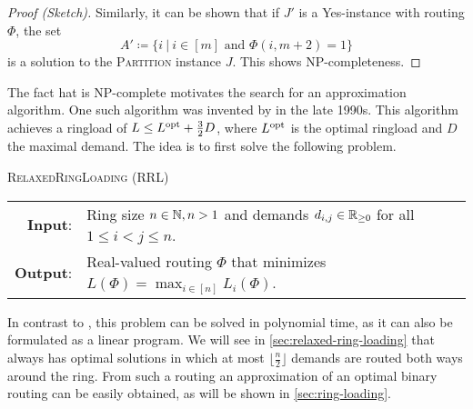\begin{proof}[Proof (Sketch)]
	Similarly, it can be shown that if $J'$ is a Yes-instance with routing $\Phi$, the set 
	\begin{equation}
		A' \coloneqq \{i \ |\ i \in [m] \text{ and } \Phi(i, m+2) = 1\}
	\end{equation} 
	is a solution to the \textsc{Partition} instance $J$.
	This shows NP-completeness.
\end{proof}



The fact hat \RL is NP-complete motivates the search for an approximation algorithm.
One such algorithm was invented by \citet{schrijver99} in the late 1990s.
This algorithm achieves a ringload of $L \leq L^{\mathrm{opt}} + \frac{3}{2}D$, where $L^{\mathrm{opt}}$ is the optimal ringload and $D$ the maximal demand.
The idea is to first solve the following problem.
\begin{center}
	\begin{mdframed}
		\centering
		\textsc{RelaxedRingLoading} (\textsc{RRL})\\[0.7em]
		\begin{tabular}{rl}
			{\bfseries Input}: & Ring size $n \in \mathbb{N}, n > 1$ and demands $d_{i, j} \in \mathbb{R}_{\geq 0}$ for all $1 \leq i<j\leq n$.\\
			{\bfseries Output}: & Real-valued routing $\Phi$ that minimizes $L(\Phi) = \max_{i \in [n]} L_i(\Phi)$.
		\end{tabular}
	\end{mdframed}
\end{center}
In contrast to \RL, this problem can be solved in polynomial time, as it can also be formulated as a linear program.
We will see in \cref{sec:relaxed-ring-loading} that \RRL always has optimal solutions in which at most $\lfloor \frac{n}{2} \rfloor$ demands are routed both ways around the ring.
From such a routing an approximation of an optimal binary routing can be easily obtained, as will be shown in \cref{sec:ring-loading}.

